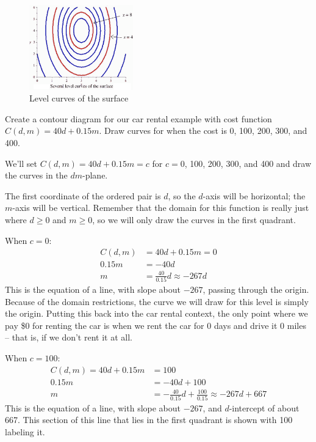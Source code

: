 \begin{figure}[!ht]
  \centering
    \includegraphics[width=0.4\textwidth]{img/chap4/image022.png}
    \caption{Level curves of the surface}
    \label{fig:4-1-contour4}
  \end{figure}
\begin{example}
Create a contour diagram for our car rental example with cost function $C(d,m)=40d+0.15m$. Draw curves for when the cost is 0, 100, 200, 300, and 400.

\begin{solution}
  We'll set $C(d,m)=40d+0.15m=c$ for $c = 0$, 100, 200, 300, and 400 and draw the curves in the $dm$-plane.

The first coordinate of the ordered pair is $d$, so the $d$-axis will be horizontal; the $m$-axis will be vertical. Remember that the domain for this function is really just where $d \geq 0$ and $m \geq 0$, so we will only draw the curves in the first quadrant.

When $c=0$:
\begin{align*}
C(d,m)  &= 40d + 0.15m = 0 \\
0.15m   &= -40d \\
m       &= \frac{40}{0.15}d \approx   -267d
\end{align*}
This is the equation of a line, with slope about $-267$, passing through the origin. Because of the domain restrictions, the curve we will draw for this level is simply the origin. Putting this back into the car rental context, the only point where we pay \$0 for renting the car is when we rent the car for 0 days and drive it 0 miles -- that is, if we don't rent it at all.

When $c=100$:
\begin{align*}
C(d,m) = 40d + 0.15m &= 100 \\
    0.15m &= -40d+100 \\
    m &= -\frac{40}{0.15}d + \frac{100}{0.15}\approx   -267d+667
\end{align*}
This is the equation of a line, with slope about $-267$, and $d$-intercept of about 667. This section of this line that lies in the first quadrant is shown with 100 labeling it.


\end{solution}
\end{example}
